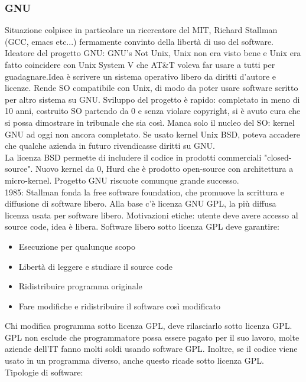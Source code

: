 \documentclass{article}
\begin{document}
\subsubsection{GNU}
Situazione colpisce in particolare un ricercatore del MIT, Richard Stallman (GCC, emacs etc...) fermamente convinto della libertà di uso del software. Ideatore del progetto GNU: GNU's Not Unix, Unix non era visto bene e Unix era fatto coincidere con Unix System V che AT\&T voleva far usare a tutti per guadagnare.Idea è scrivere un sistema operativo libero da diritti d'autore e licenze. Rende SO compatibile con Unix, di modo da poter usare software scritto per altro sistema su GNU. Sviluppo del progetto è rapido: completato in meno di 10 anni, costruito SO partendo da 0 e senza violare copyright, si è avuto cura che si possa dimostrare in tribunale che sia così. Manca solo il nucleo del SO: kernel GNU ad oggi non ancora completato. Se usato kernel Unix BSD, poteva accadere che qualche azienda in futuro rivendicasse diritti su GNU.\\ La licenza BSD permette di includere il codice in prodotti commerciali "closed-source". Nuovo kernel da 0, Hurd che è prodotto open-source con architettura a micro-kernel. Progetto GNU riscuote comunque grande successo.\\ 1985: Stallman fonda la free software foundation, che promuove la scrittura e diffusione di software libero. Alla base c'è licenza GNU GPL, la più diffusa licenza usata per software libero. Motivazioni etiche: utente deve avere accesso al source code, idea è libera. Software libero sotto licenza GPL deve garantire:
\begin{itemize}
\item Esecuzione per qualunque scopo
\item Libertà di leggere e studiare il source code
\item Ridistribuire programma originale
\item Fare modifiche e ridistribuire il software così modificato
\end{itemize}
Chi modifica programma sotto licenza GPL, deve rilasciarlo sotto licenza GPL. GPL non esclude che programmatore possa essere pagato per il suo lavoro, molte aziende dell'IT fanno molti soldi usando software GPL. Inoltre, se il codice viene usato in un programma diverso, anche questo ricade sotto licenza GPL.\\ Tipologie di software:
\end{document}
